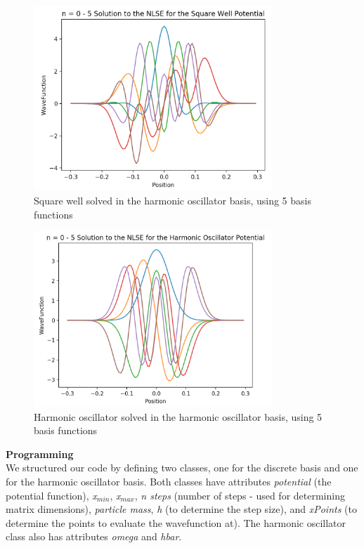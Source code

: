 \documentclass[%
 reprint,
 amsmath,amssymb,
 aps,
]{revtex4-1}
\begin{document}
\begin{figure}
\includegraphics[width=9cm]{HOBasisSquareWell}
\caption{Square well solved in the harmonic oscillator basis, using 5 basis functions}
\end{figure}
\begin{figure}
\includegraphics[width=9cm]{HOBasisHarmonicOscillator}
\caption{Harmonic oscillator solved in the harmonic oscillator basis, using 5 basis functions}
\end{figure}

\noindent \textbf{Programming}\\

\noindent We structured our code by defining two classes, one for the discrete basis and one for the harmonic oscillator basis.  Both classes have attributes \textit{potential} (the potential function), \textit{x}$_{min}$, \textit{x}$_{max}$, \textit{n steps} (number of steps - used for determining matrix dimensions), \textit{particle mass}, \textit{h} (to determine the step size), and \textit{xPoints} (to determine the points to evaluate the wavefunction at).  The harmonic oscillator class also has attributes \textit{omega} and \textit{hbar}.\\
\end{document}
